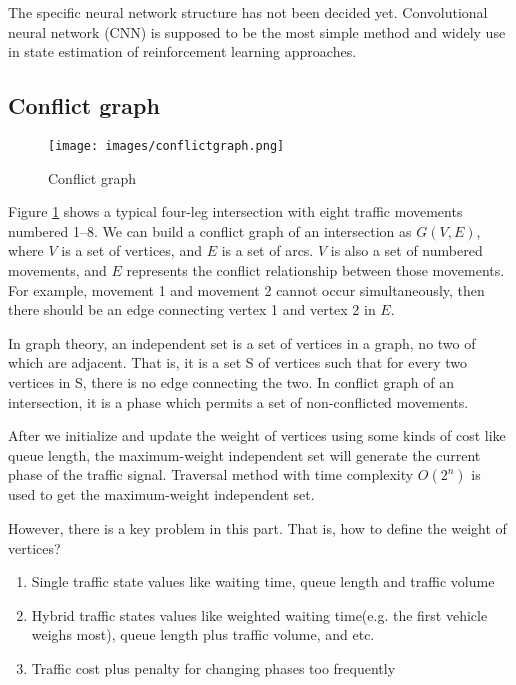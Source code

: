 \documentclass{article}
\begin{document}
The specific neural network structure has not been decided yet. Convolutional neural network (CNN) is supposed to be the most simple method and widely use in state estimation of reinforcement learning approaches. 

\subsection{Conflict graph}

\begin{figure}[htbp]
    \centering
    \texttt{[image: images/conflictgraph.png]}
    \caption{Conflict graph}
    \label{fig:cg}
\end{figure}

Figure \ref{fig:cg} shows a typical four-leg intersection with eight traffic movements numbered 1–8. We can build a conflict graph of an intersection as $G(V,E)$, where $V$ is a set of vertices, and $E$ is a set of arcs. $V$ is also a set of numbered movements, and $E$ represents the conflict relationship between those movements. For example, movement 1 and movement 2 cannot occur simultaneously, then there should be an edge connecting vertex 1 and vertex 2 in $E$.

In graph theory, an independent set is a set of vertices in a graph, no two of which are adjacent. That is, it is a set S of vertices such that for every two vertices in S, there is no edge connecting the two. In conflict graph of an intersection, it is a phase which permits a set of non-conflicted movements.

After we initialize and update the weight of vertices using some kinds of cost like queue length, the maximum-weight independent set will generate the current phase of the traffic signal. Traversal method with time complexity $O(2^n)$ is used to get the maximum-weight independent set. 

However, there is a key problem in this part. That is, how to define the weight of vertices?

\begin{enumerate}
    \item Single traffic state values like waiting time, queue length and traffic volume
    \item Hybrid traffic states values like weighted waiting time(e.g. the first vehicle weighs most), queue length plus traffic volume, and etc.
    \item Traffic cost plus penalty for changing phases too frequently
    
\end{enumerate}
\end{document}
